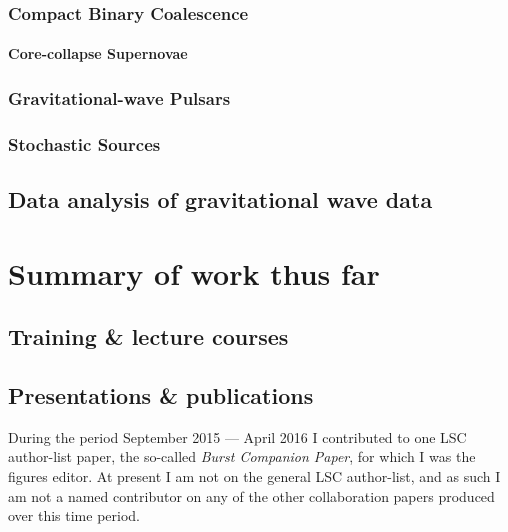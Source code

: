\documentclass{kentigern}
\begin{document}
\section{Compact Binary Coalescence}
\label{sec:cbc}


\subsection{Core-collapse Supernovae}
\label{sec:sn}


\section{Gravitational-wave Pulsars}
\label{sec:pulsar}


\section{Stochastic Sources}
\label{sec:stochastic-sources}


\chapter{Data analysis of gravitational wave data}
\label{cha:data-analys-grav}


\part{Summary of work thus far}
\label{part:work}

\chapter{Training \& lecture courses}
\label{chap:lectures}

\chapter{Presentations \& publications}
\label{chap:pandp}

During the period September 2015 --- April 2016 I contributed to one
LSC author-list paper, the so-called \emph{Burst Companion Paper}, for
which I was the figures editor. At present I am not on the general LSC
author-list, and as such I am not a named contributor on any of the
other collaboration papers produced over this time period.
\end{document}
